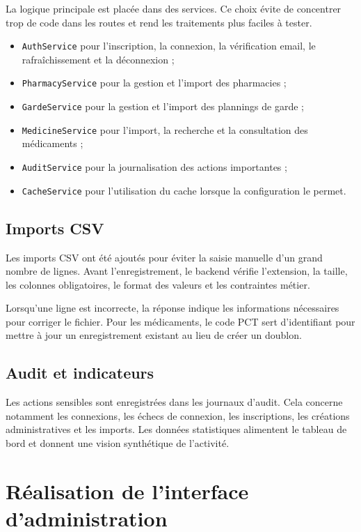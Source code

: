 La logique principale est placée dans des services. Ce choix évite de concentrer trop de code dans les
routes et rend les traitements plus faciles à tester.

\begin{itemize}
    \item \texttt{AuthService} pour l'inscription, la connexion, la vérification email, le rafraîchissement et la déconnexion ;
    \item \texttt{PharmacyService} pour la gestion et l'import des pharmacies ;
    \item \texttt{GardeService} pour la gestion et l'import des plannings de garde ;
    \item \texttt{MedicineService} pour l'import, la recherche et la consultation des médicaments ;
    \item \texttt{AuditService} pour la journalisation des actions importantes ;
    \item \texttt{CacheService} pour l'utilisation du cache lorsque la configuration le permet.
\end{itemize}

\subsection{Imports CSV}

Les imports CSV ont été ajoutés pour éviter la saisie manuelle d'un grand nombre de lignes. Avant
l'enregistrement, le backend vérifie l'extension, la taille, les colonnes obligatoires, le format des
valeurs et les contraintes métier.

Lorsqu'une ligne est incorrecte, la réponse indique les informations nécessaires pour corriger le fichier.
Pour les médicaments, le code PCT sert d'identifiant pour mettre à jour un enregistrement existant au lieu
de créer un doublon.

\subsection{Audit et indicateurs}

Les actions sensibles sont enregistrées dans les journaux d'audit. Cela concerne notamment les
connexions, les échecs de connexion, les inscriptions, les créations administratives et les imports. Les
données statistiques alimentent le tableau de bord et donnent une vision synthétique de l'activité.

\section{Réalisation de l'interface d'administration}

